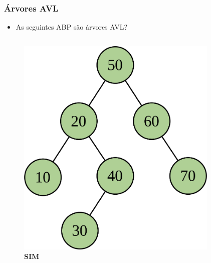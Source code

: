 \documentclass[aspectratio=169]{beamer}
\begin{document}
\begin{frame}\frametitle{Árvores AVL}
\begin{itemize}
	\item As seguintes ABP são árvores AVL?
\end{itemize}
\vspace{-3mm}
\begin{columns}[T]
\begin{column}{0.5\linewidth}
\begin{figure}[h]
	\centering
	\includegraphics[height=0.5\paperheight]{imagens/avl07b.png}\\
	\textbf{SIM}
\end{figure}
\end{column}
\begin{column}{0.5\linewidth}
\begin{figure}[h]
	\centering

\end{figure}
\end{column}
\end{columns}
\end{frame}
\end{document}
